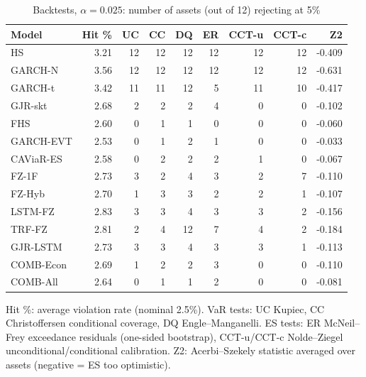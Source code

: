 \begin{table}[htbp]
\centering
\footnotesize
\caption{Backtests, $\alpha=0.025$: number of assets (out of 12) rejecting at 5\%}
\label{tab:bt_a025}
\begin{tabular}{lrrrrrrrr}
\toprule
Model & Hit \% & UC & CC & DQ & ER & CCT-u & CCT-c & Z2 \\
\midrule
HS & 3.21 & 12 & 12 & 12 & 12 & 12 & 12 & -0.409 \\
GARCH-N & 3.56 & 12 & 12 & 12 & 12 & 12 & 12 & -0.631 \\
GARCH-t & 3.42 & 11 & 11 & 12 & 5 & 11 & 10 & -0.417 \\
GJR-skt & 2.68 & 2 & 2 & 2 & 4 & 0 & 0 & -0.102 \\
FHS & 2.60 & 0 & 1 & 1 & 0 & 0 & 0 & -0.060 \\
GARCH-EVT & 2.53 & 0 & 1 & 2 & 1 & 0 & 0 & -0.033 \\
CAViaR-ES & 2.58 & 0 & 2 & 2 & 2 & 1 & 0 & -0.067 \\
FZ-1F & 2.73 & 3 & 2 & 4 & 3 & 2 & 7 & -0.110 \\
FZ-Hyb & 2.70 & 1 & 3 & 3 & 2 & 2 & 1 & -0.107 \\
LSTM-FZ & 2.83 & 3 & 3 & 4 & 3 & 3 & 2 & -0.156 \\
TRF-FZ & 2.81 & 2 & 4 & 12 & 7 & 4 & 2 & -0.184 \\
GJR-LSTM & 2.73 & 3 & 3 & 4 & 3 & 3 & 1 & -0.113 \\
COMB-Econ & 2.69 & 1 & 2 & 2 & 3 & 0 & 0 & -0.110 \\
COMB-All & 2.64 & 0 & 1 & 1 & 2 & 0 & 0 & -0.081 \\
\bottomrule
\end{tabular}
\par\smallskip\parbox{\linewidth}{\scriptsize Hit \%: average violation rate (nominal 2.5\%). VaR tests: UC Kupiec, CC Christoffersen conditional coverage, DQ Engle--Manganelli. ES tests: ER McNeil--Frey exceedance residuals (one-sided bootstrap), CCT-u/CCT-c Nolde--Ziegel unconditional/conditional calibration. Z2: Acerbi--Szekely statistic averaged over assets (negative = ES too optimistic).}
\end{table}